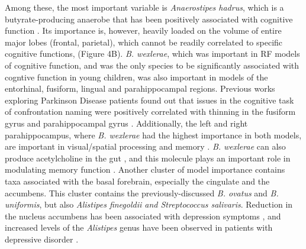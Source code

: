 \documentclass{article}
\begin{document}
Among these, the most important variable is \emph{Anaerostipes hadrus},
which is a butyrate-producing anaerobe that has been positively
associated with cognitive function
\cite{kantGenomeSequenceButyrateProducing2015,liCorrelationsGutMicrobiota2022}.
Its importance is, however, heavily loaded on the volume
of entire major lobes (frontal, parietal), which cannot be readily
correlated to specific cognitive functions, (Figure 4B).
\emph{B. wexlerae}, which was important in RF models of cognitive function,
and was the only species to be significantly associated
with cogntive function in young children, 
was also important in models of the entorhinal, fusiform, lingual and
parahippocampal regions. Previous works exploring Parkinson Disease patients
found out that issues in the cognitive task of confrontation naming were
positively correlated with thinning in the fusiform gyrus and
parahippocampal gyrus
\cite{pagonabarragaPatternRegionalCortical2013}.
Additionally, the left and right parahippocampus, where \emph{B.
wexlerae} had the highest importance in both models, are important in
visual/spatial processing and memory
\cite{aminoffRoleParahippocampalCortex2013}.
\emph{B. wexlerae} can also produce acetylcholine in the gut
\cite{hosomiOralAdministrationBlautia2022},
and this molecule plays an important role in modulating memory function
\cite{haamCholinergicModulationHippocampal2017}.
Another cluster of model importance contains taxa associated with the
basal forebrain, especially the cingulate and the accumbens. This
cluster contains the previously-discussed \emph{B. ovatus} and \emph{B.
uniformis}, but also \emph{Alistipes finegoldii and Streptococcus
salivaris}. Reduction in the nucleus accumbens has been associated with
depression symptoms \cite{wackerRoleNucleusAccumbens2009},
and increased levels of the \emph{Alistipes} genus have been
observed in patients with depressive disorder
\cite{jiangAlteredFecalMicrobiota2015}.
\end{document}
